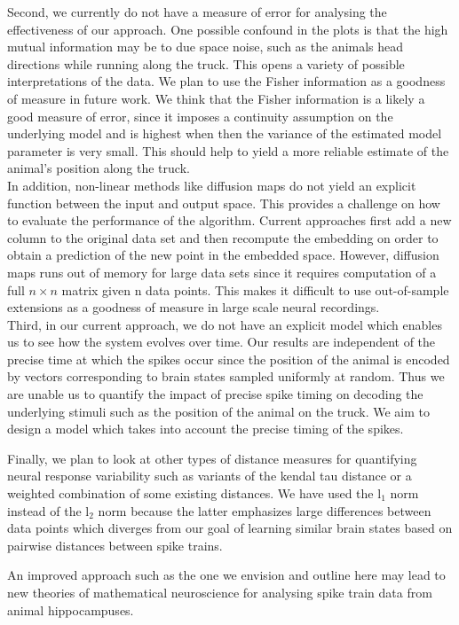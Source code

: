 Second, we currently do not have a measure of error for analysing the  effectiveness of our approach. One possible confound in the plots is that the high  mutual information may be to due space noise, such as the animals head directions while running along the truck. This opens a variety of possible interpretations of the data. We plan to use the Fisher information as a goodness of measure in future work. We think that the Fisher information is a likely a good measure of error, since it imposes a continuity assumption on the underlying model and is highest when then the variance of the estimated model parameter is very small.
This should help to yield a more reliable estimate of the animal's position along the truck. \\

In addition, non-linear methods like diffusion maps do not yield an explicit function between the input and output space. This provides a challenge on how to evaluate the performance of the algorithm. Current approaches first add a new column to the original data set and then recompute the embedding on order to obtain a prediction of the new point in the embedded space. However, diffusion maps runs out of memory for large data sets since it requires computation of a full $n \times n$ matrix given n data points. This makes it difficult to use out-of-sample extensions as a goodness of measure in large scale neural recordings.\\

Third, in our current approach, we do not have an explicit model which enables
us to see how the system evolves over time.
Our results are independent of the precise time at which the spikes occur since the position of the animal is encoded by vectors corresponding to brain states
sampled uniformly at random. Thus we are unable us to quantify the impact of precise spike timing on decoding the underlying stimuli such as the position
of the animal on the truck. We aim to design a model which takes into account the precise timing of the spikes. 

Finally, we plan to look at other types of distance measures for quantifying neural response variability such as variants of the kendal tau distance 
or a weighted combination of some existing distances. We have used the l$_1$
norm instead of the l$_{2}$ norm because the latter emphasizes large differences between data points which diverges from our goal of learning similar brain states 
based on pairwise distances between spike trains.


An improved approach such as the one we envision and outline here 
may lead to new theories of mathematical neuroscience for analysing spike train data from animal hippocampuses.















